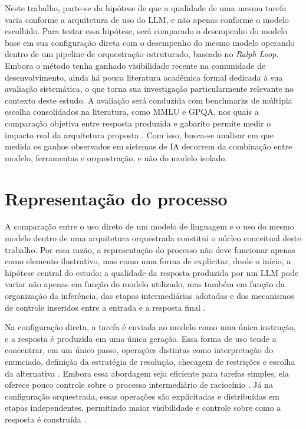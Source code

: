 \documentclass[a4paper,10pt,twocolumn]{article}
\begin{document}
Neste trabalho, parte-se da hipótese de que a qualidade de uma mesma tarefa varia conforme a arquitetura de uso do LLM, e não apenas conforme o modelo escolhido. Para testar essa hipótese, será comparado o desempenho do modelo base em sua configuração direta com o desempenho do mesmo modelo operando dentro de um pipeline de orquestração estruturado, baseado no \textit{Ralph Loop}. Embora o método tenha ganhado visibilidade recente na comunidade de desenvolvimento, ainda há pouca literatura acadêmica formal dedicada à sua avaliação sistemática, o que torna sua investigação particularmente relevante no contexto deste estudo. A avaliação será conduzida com benchmarks de múltipla escolha consolidados na literatura, como MMLU e GPQA, nos quais a comparação objetiva entre resposta produzida e gabarito permite medir o impacto real da arquitetura proposta \cite{hendrycks2021measuring,rein2023gpqa}. Com isso, busca-se analisar em que medida os ganhos observados em sistemas de IA decorrem da combinação entre modelo, ferramentas e orquestração, e não do modelo isolado.

\FloatBarrier
\section{Representação do processo}

A comparação entre o uso direto de um modelo de linguagem e o uso do mesmo modelo dentro de uma arquitetura orquestrada constitui o núcleo conceitual deste trabalho. Por essa razão, a representação do processo não deve funcionar apenas como elemento ilustrativo, mas como uma forma de explicitar, desde o início, a hipótese central do estudo: a qualidade da resposta produzida por um LLM pode variar não apenas em função do modelo utilizado, mas também em função da organização da inferência, das etapas intermediárias adotadas e dos mecanismos de controle inseridos entre a entrada e a resposta final \cite{wei2022chain,yao2023tree,madaan2023selfrefine}.

Na configuração direta, a tarefa é enviada ao modelo como uma única instrução, e a resposta é produzida em uma única geração. Essa forma de uso tende a concentrar, em um único passo, operações distintas como interpretação do enunciado, definição da estratégia de resolução, checagem de restrições e escolha da alternativa \cite{kojima2022large,brown2020language}. Embora essa abordagem seja eficiente para tarefas simples, ela oferece pouco controle sobre o processo intermediário de raciocínio \cite{wei2022chain}. Já na configuração orquestrada, essas operações são explicitadas e distribuídas em etapas independentes, permitindo maior visibilidade e controle sobre como a resposta é construída \cite{shinn2023reflexion,wang2023selfconsistency}.
\end{document}
